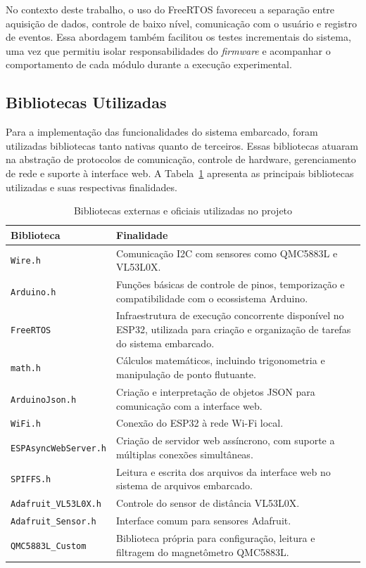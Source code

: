 \documentclass[	12pt, Times, openright, twoside, a4paper, english, brazil]{abntex2}
\begin{document}
No contexto deste trabalho, o uso do FreeRTOS favoreceu a separação entre aquisição de dados, controle de baixo nível, comunicação com o usuário e registro de eventos. Essa abordagem também facilitou os testes incrementais do sistema, uma vez que permitiu isolar responsabilidades do \textit{firmware} e acompanhar o comportamento de cada módulo durante a execução experimental.

\subsection{Bibliotecas Utilizadas}

Para a implementação das funcionalidades do sistema embarcado, foram utilizadas bibliotecas tanto nativas quanto de terceiros. Essas bibliotecas atuaram na abstração de protocolos de comunicação, controle de hardware, gerenciamento de rede e suporte à interface web. A Tabela~\ref{tab:libs_oficiais} apresenta as principais bibliotecas utilizadas e suas respectivas finalidades.

\begin{table}[ht]
	\centering
	\caption{Bibliotecas externas e oficiais utilizadas no projeto}
	\label{tab:libs_oficiais}
	\begin{tabular}{|p{5cm}|p{10cm}|}
		\hline
		\textbf{Biblioteca} & \textbf{Finalidade} \\
		\hline
		\texttt{Wire.h} & Comunicação I2C com sensores como QMC5883L e VL53L0X. \\
		\texttt{Arduino.h} & Funções básicas de controle de pinos, temporização e compatibilidade com o ecossistema Arduino. \\
		\texttt{FreeRTOS} & Infraestrutura de execução concorrente disponível no ESP32, utilizada para criação e organização de tarefas do sistema embarcado. \\
		\texttt{math.h} & Cálculos matemáticos, incluindo trigonometria e manipulação de ponto flutuante. \\
		\texttt{ArduinoJson.h} & Criação e interpretação de objetos JSON para comunicação com a interface web. \\
		\texttt{WiFi.h} & Conexão do ESP32 à rede Wi-Fi local. \\
		\texttt{ESPAsyncWebServer.h} & Criação de servidor web assíncrono, com suporte a múltiplas conexões simultâneas. \\
		\texttt{SPIFFS.h} & Leitura e escrita dos arquivos da interface web no sistema de arquivos embarcado. \\
		\texttt{Adafruit\_VL53L0X.h} & Controle do sensor de distância VL53L0X. \\
		\texttt{Adafruit\_Sensor.h} & Interface comum para sensores Adafruit. \\
		\texttt{QMC5883L\_Custom} & Biblioteca própria para configuração, leitura e filtragem do magnetômetro QMC5883L. \\
		\hline
	\end{tabular}
\end{table}
\end{document}
